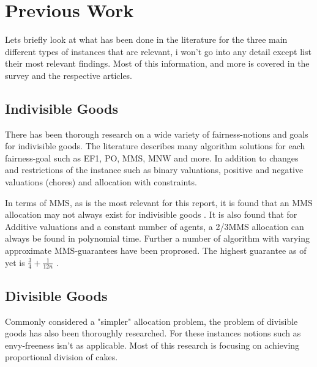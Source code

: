 \section{Previous Work}\label{sec:previous-work}

Lets briefly look at what has been done in the literature for the three main different types of instances that are relevant, i won't go into any detail except list their most relevant findings. Most of this information, and more is covered in the survey \cite{survey} and the respective articles.


\subsection{Indivisible Goods}\label{subsec:indivisible-goods}

There has been thorough research on a wide variety of fairness-notions and goals for indivisible goods. The literature describes many algorithm solutions for each fairness-goal such as EF1, PO, MMS, MNW and more. In addition to changes and restrictions of the instance such as binary valuations, positive and negative valuations (chores) and allocation with constraints.

In terms of MMS, as is the most relevant for this report, it is found that an MMS allocation may not always exist for indivisible goods \cite{2-3-mms}. It is also found that for Additive valuations and a constant number of agents, a 2/3MMS allocation can always be found \cite{2-3-mms} in polynomial time. Further a number of algorithm with varying approximate MMS-guarantees have been proprosed. The highest guarantee as of yet is $\frac{3}{4}+\frac{1}{12n}$ \cite{best-mms}.

\subsection{Divisible Goods}\label{subsec:divisible-goods}
Commonly considered a "simpler" allocation problem, the problem of divisible goods has also been thoroughly researched. For these instances notions such as envy-freeness isn't as applicable. Most of this research is focusing on achieving proportional division of cakes.




